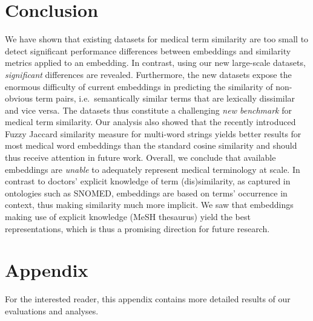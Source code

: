 \documentclass[letterpaper]{article} %
\begin{document}
\section{Conclusion}
We have shown that existing datasets for medical term similarity are too small to detect significant performance differences between embeddings and similarity metrics applied to an embedding.
In contrast, using our new large-scale datasets, \emph{significant} differences are revealed.
Furthermore, the new datasets expose the enormous difficulty of current embeddings in predicting the similarity of non-obvious term pairs, i.e.~semantically similar terms that are lexically dissimilar and vice versa.
The datasets thus constitute a challenging \emph{new benchmark} for medical term similarity.
Our analysis also showed that the recently introduced Fuzzy Jaccard similarity measure for multi-word strings \cite{ZhelezniakEtAl2019-fuzzyJaccard} yields better results for most medical word embeddings than the standard cosine similarity and should thus receive attention in future work.
Overall, we conclude that available embeddings are \emph{unable} to adequately represent medical terminology at scale. 
In contrast to doctors' explicit knowledge of term (dis)similarity, as captured in ontologies such as SNOMED, embeddings are based on terms' occurrence in context, thus making similarity much more implicit.
We saw that embeddings making use of explicit knowledge (MeSH thesaurus) yield the best representations, which is thus a promising direction for future research.





\onecolumn
\newpage

\twocolumn
\appendix
\section*{Appendix}


\noindent For the interested reader, this appendix contains more detailed results of our evaluations and analyses. \\
\end{document}
